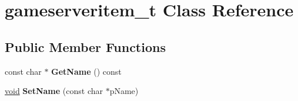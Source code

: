 \hypertarget{classgameserveritem__t}{}\section{gameserveritem\+\_\+t Class Reference}
\label{classgameserveritem__t}
\subsection*{Public Member Functions}
\begin{DoxyCompactItemize}
\item 
\hypertarget{classgameserveritem__t_a3143947f61c5d15d217acae7cce665bb}{}const char $\ast$ {\bfseries Get\+Name} () const \label{classgameserveritem__t_a3143947f61c5d15d217acae7cce665bb}

\item 
\hypertarget{classgameserveritem__t_a6ec4fca79899e69b0d157c4dcd385bc5}{}\hyperlink{SDL__audio_8h_a52835ae37c4bb905b903cbaf5d04b05f}{void} {\bfseries Set\+Name} (const char $\ast$p\+Name)\label{classgameserveritem__t_a6ec4fca79899e69b0d157c4dcd385bc5}

\end{DoxyCompactItemize}
